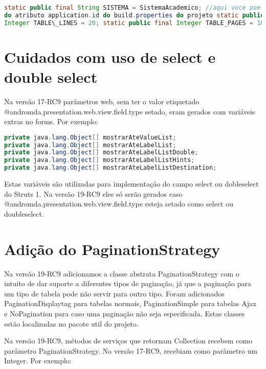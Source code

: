 \begin{framed}
\begin{lstlisting}[language=java]
static public final String SISTEMA = SistemaAcademico; //aqui voce poe o valor
do atributo application.id do build.properties do projeto static public final
Integer TABLE\_LINES = 20; static public final Integer TABLE_PAGES = 10;
\end{lstlisting}
\end{framed}

\section{Cuidados com uso de select e double select}
Na versão 17-RC9 parâmetros web, sem ter o valor etiquetado
@andromda.presentation.web.view.field.type setado, eram gerados com variáveis extras no forms. Por exemplo:

\begin{framed}
\begin{lstlisting}[language=java]
private java.lang.Object[] mostrarAteValueList;
private java.lang.Object[] mostrarAteLabelList;
private java.lang.Object[] mostrarAteLabelListDouble;
private java.lang.Object[] mostrarAteLabelListHints;
private java.lang.Object[] mostrarAteLabelListDestination;
\end{lstlisting}
\end{framed}

Estas variáveis são utilizadas para implementação do campo select ou dobleselect
do Struts 1. Na versão 19-RC9 eles só serão gerados caso @andromda.presentation.web.view.field.type esteja setado como select ou doubleselect. 

\section{Adição do PaginationStrategy}
Na versão 19-RC9 adicionamos a classe abstrata PaginationStrategy com o intuito
de dar suporte a diferentes tipos de paginação, já que a paginação para um tipo de tabela pode não servir para outro tipo. Foram adicionados PaginationDisplaytag para tabelas normais, PaginationSimple para tabelas Ajax e NoPagination para caso uma paginação não seja especificada. Estas classes estão localizadas no pacote util do projeto.

Na versão 19-RC9, métodos de serviços que retornam Collection recebem como
parâmetro PaginationStrategy. Na versão 17-RC9,  recebiam como parâmetro um Integer. Por exemplo:

